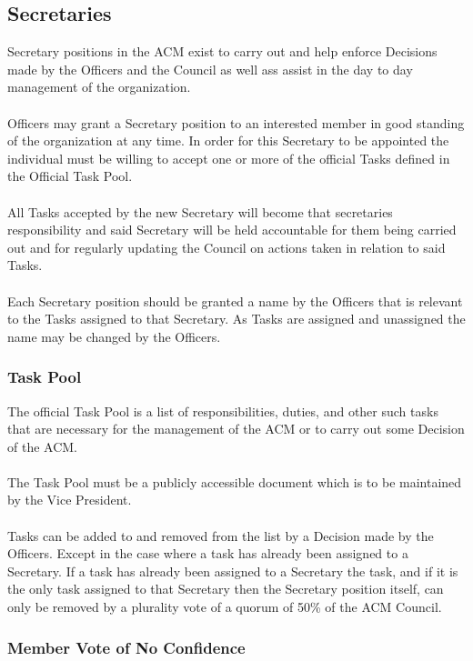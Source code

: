 \documentclass[12pt,titlepage]{article}
\begin{document}
\subsection{Secretaries}

Secretary positions in the ACM exist to carry out and help enforce Decisions made by the Officers and the Council as well ass assist in the day to day management of the organization.\\
\\
Officers may grant a Secretary position to an interested member in good standing of the organization at any time. In order for this Secretary to be appointed the individual must be willing to accept one or more of the official Tasks defined in the Official Task Pool.\\
\\
All Tasks accepted by the new Secretary will become that secretaries responsibility and said Secretary will be held accountable for them being carried out and for regularly updating the Council on actions taken in relation to said Tasks.\\
\\
Each Secretary position should be granted a name by the Officers that is relevant to the Tasks assigned to that Secretary. As Tasks are assigned and unassigned the name may be changed by the Officers.

\subsubsection{Task Pool}

The official Task Pool is a list of responsibilities, duties, and other such tasks that are necessary for the management of the ACM or to carry out some Decision of the ACM.\\
\\
The Task Pool must be a publicly accessible document which is to be maintained by the Vice President.\\
\\
Tasks can be added to and removed from the list by a Decision made by the Officers. Except in the case where a task has already been assigned to a Secretary. If a task has already been assigned to a Secretary the task, and if it is the only task assigned to that Secretary then the Secretary position itself, can only be removed by a plurality vote of a quorum of 50\% of the ACM Council.

\subsubsection{Member Vote of No Confidence}
\end{document}
